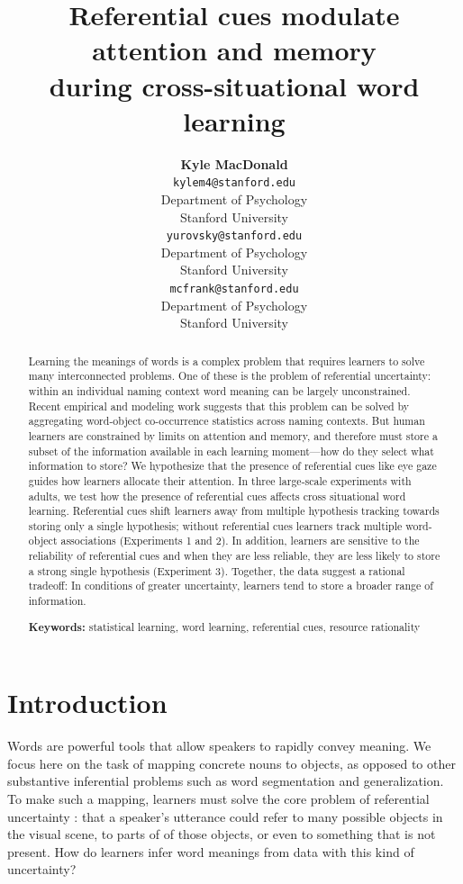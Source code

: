 \documentclass[10pt,letterpaper]{article}
\title{Referential cues modulate attention and memory \\
during cross-situational word learning}
\author{{\large \bf Kyle MacDonald} \\ \texttt{kylem4@stanford.edu} \\ Department of Psychology \\ Stanford University
  \And {\large \bf  Daniel Yurovsky} \\ \texttt{yurovsky@stanford.edu} \\ Department of Psychology \\ Stanford University
  \And {\large \bf Michael C. Frank} \\  \texttt{mcfrank@stanford.edu} \\Department of Psychology \\ Stanford University}
\begin{document}

\maketitle


\begin{abstract}
Learning the meanings of words is a complex problem that requires learners to solve many interconnected problems. One of these is the problem of referential uncertainty: within an individual naming context word meaning can be largely unconstrained. Recent empirical and modeling work suggests that this problem can be solved by aggregating word-object co-occurrence statistics across naming contexts. But human learners are constrained by limits on attention and memory, and therefore must store a subset of the information available in each learning moment---how do they select what information to store? We hypothesize that the presence of referential cues like eye gaze guides how learners allocate their attention. In three large-scale experiments with adults, we test how the presence of referential cues affects cross situational word learning. Referential cues shift learners away from multiple hypothesis tracking towards storing only a single hypothesis; without referential cues learners track multiple word-object associations (Experiments 1 and 2). In addition, learners are sensitive to the reliability of referential cues and when they are less reliable, they are less likely to store a strong single hypothesis (Experiment 3).  Together, the data suggest a rational tradeoff: In conditions of greater uncertainty, learners tend to store a broader range of information. 

\textbf{Keywords:} 
statistical learning, word learning, referential cues, resource rationality
\end{abstract}


\section{Introduction}

Words are powerful tools that allow speakers to rapidly convey meaning. We focus here on the task of mapping concrete nouns to objects, as opposed to other substantive inferential problems such as word segmentation and generalization. To make such a mapping, learners must solve the core problem of referential uncertainty \cite{quine19600}: that a speaker's utterance could refer to many possible objects in the visual scene, to parts of of those objects, or even to something that is not present. How do learners infer word meanings from data with this kind of uncertainty?
\end{document}
